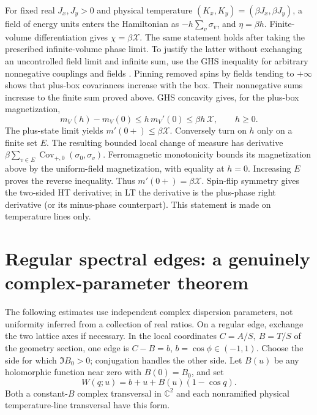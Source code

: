 \documentclass[11pt]{article}
\numberwithin{equation}{section}
\theoremstyle{definition}
\newcommand{\C}{\mathbb C}
\begin{document}
For fixed real \(J_x,J_y>0\) and physical temperature
\((K_x,K_y)=(\beta J_x,\beta J_y)\), a field of energy units enters
the Hamiltonian as \(-h\sum_v\sigma_v\), and \(\eta=\beta h\).
Finite-volume differentiation gives \(\chi=\beta\mathcal X\).
The same statement holds after taking the prescribed infinite-volume
phase limit. To justify the latter without exchanging an uncontrolled
field limit and infinite sum, use the GHS inequality for arbitrary
nonnegative couplings and fields \cite[Theorem 1.5]{CGN}.
Pinning removed spins by fields tending to \(+\infty\) shows that
plus-box covariances increase with the box. Their nonnegative sums
increase to the finite sum proved above. GHS concavity gives, for
the plus-box magnetization,
\[
 m_V(h)-m_V(0)\le h\,m_V'(0)
       \le\beta h\,\mathcal X,\qquad h\ge0.
\]
The plus-state limit yields \(m'(0+)\le\beta\mathcal X\).
Conversely turn on \(h\) only on a finite set \(E\). The resulting
bounded local change of measure has derivative
\(\beta\sum_{v\in E}\operatorname{Cov}_{+,0}(\sigma_0,\sigma_v)\).
Ferromagnetic monotonicity bounds its magnetization above by the
uniform-field magnetization, with equality at \(h=0\).
Increasing \(E\) proves the reverse inequality. Thus
\(m'(0+)=\beta\mathcal X\). Spin-flip symmetry gives the two-sided
HT derivative; in LT the derivative is the plus-phase right
derivative (or its minus-phase counterpart).
This statement is made on temperature lines only.

\section{Regular spectral edges: a genuinely complex-parameter theorem}
\label{ana:edges}

The following estimates use independent complex dispersion parameters,
not uniformity inferred from a collection of real ratios.
On a regular edge, exchange the two lattice axes if necessary.
In the local coordinates \(C=A/S,\ B=T/S\) of the geometry section,
one edge is \(C-B=b\), \(b=\cos\phi\in(-1,1)\).
Choose the side for which \(\Im B_0>0\); conjugation handles the
other side. Let \(B(u)\) be any holomorphic function near zero with
\(B(0)=B_0\), and set
\begin{equation}\label{ana:edgecurve}
 W(q;u)=b+u+B(u)(1-\cos q).
\end{equation}
Both a constant-\(B\) complex transversal in \(\C^2\) and each
nonramified physical temperature-line transversal have this form.
\end{document}
